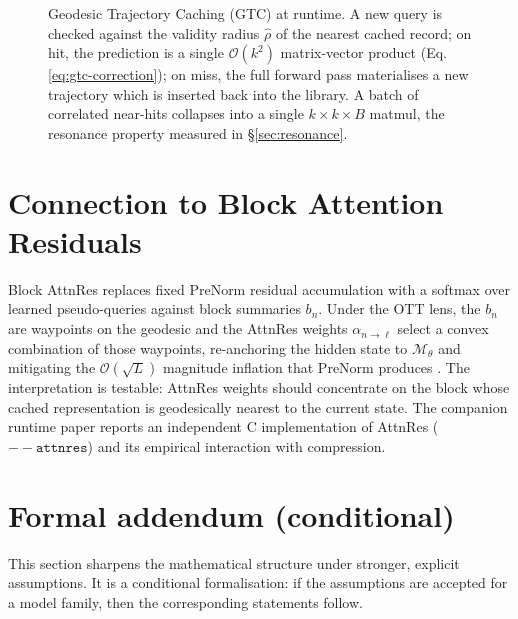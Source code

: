\documentclass[11pt]{article}
\begin{document}
\begin{figure}[h]
\caption{Geodesic Trajectory Caching (GTC) at runtime.  A new query is
checked against the validity radius $\hat\rho$ of the nearest cached
record; on hit, the prediction is a single $\mathcal{O}(k^2)$ matrix-vector
product (Eq.\eqref{eq:gtc-correction}); on miss, the full forward pass
materialises a new trajectory which is inserted back into the library.
A batch of correlated near-hits collapses into a single $k\!\times\!k\!\times\!B$
matmul, the resonance property measured in \S\ref{sec:resonance}.}
\label{fig:gtc-architecture}
\end{figure}

\section{Connection to Block Attention Residuals}

Block AttnRes \cite{kimi2026attnres} replaces fixed PreNorm residual
accumulation with a softmax over learned pseudo-queries against block
summaries $b_n$. Under the OTT lens, the $b_n$ are waypoints on the geodesic
and the AttnRes weights $\alpha_{n\to\ell}$ select a convex combination of
those waypoints, re-anchoring the hidden state to $\mathcal{M}_\theta$ and
mitigating the $\mathcal{O}(\sqrt L)$ magnitude inflation that PreNorm
produces \cite{xiao2023streamingllm}. The interpretation is testable: AttnRes
weights should concentrate on the block whose cached representation is
geodesically nearest to the current state. The companion runtime paper
\cite{papers3specdec} reports an independent C implementation of AttnRes
($\mathtt{-{}-attnres}$) and its empirical interaction with compression.

\section{Formal addendum (conditional)}
\label{sec:formal}

This section sharpens the mathematical structure under stronger, explicit
assumptions. It is a conditional formalisation: if the assumptions are
accepted for a model family, then the corresponding statements follow.
\end{document}
